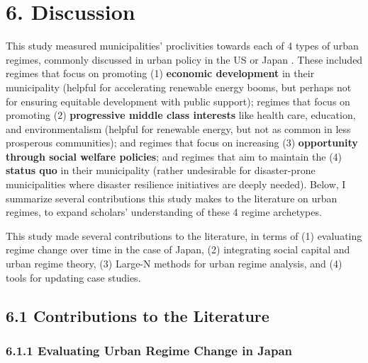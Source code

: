 \documentclass[preprint, 3p,
authoryear]{elsarticle} %
\begin{document}
\hypertarget{discussion}{%
\section{6. Discussion}\label{discussion}}

\doublespacing

This study measured municipalities' proclivities towards each of 4 types
of urban regimes, commonly discussed in urban policy in the US or Japan
\citep{stone_1989, stoker_and_mossberger_1994, bassett_1996, hill_fujita_2000, kilburn_2004, ramirez_perez_et_al_2008, sorensen_2011}.
These included regimes that focus on promoting (1) \textbf{economic
development} in their municipality (helpful for accelerating renewable
energy booms, but perhaps not for ensuring equitable development with
public support); regimes that focus on promoting (2) \textbf{progressive
middle class interests} like health care, education, and
environmentalism (helpful for renewable energy, but not as common in
less prosperous communities); and regimes that focus on increasing (3)
\textbf{opportunity through social welfare policies}; and regimes that
aim to maintain the (4) \textbf{status quo} in their municipality
(rather undesirable for disaster-prone municipalities where disaster
resilience initiatives are deeply needed). Below, I summarize several
contributions this study makes to the literature on urban regimes, to
expand scholars' understanding of these 4 regime archetypes.

This study made several contributions to the literature, in terms of (1)
evaluating regime change over time in the case of Japan, (2) integrating
social capital and urban regime theory, (3) Large-N methods for urban
regime analysis, and (4) tools for updating case studies.

\hypertarget{contributions-to-the-literature}{%
\subsection{6.1 Contributions to the
Literature}\label{contributions-to-the-literature}}

\hypertarget{evaluating-urban-regime-change-in-japan}{%
\subsubsection{6.1.1 Evaluating Urban Regime Change in
Japan}\label{evaluating-urban-regime-change-in-japan}}
\end{document}
